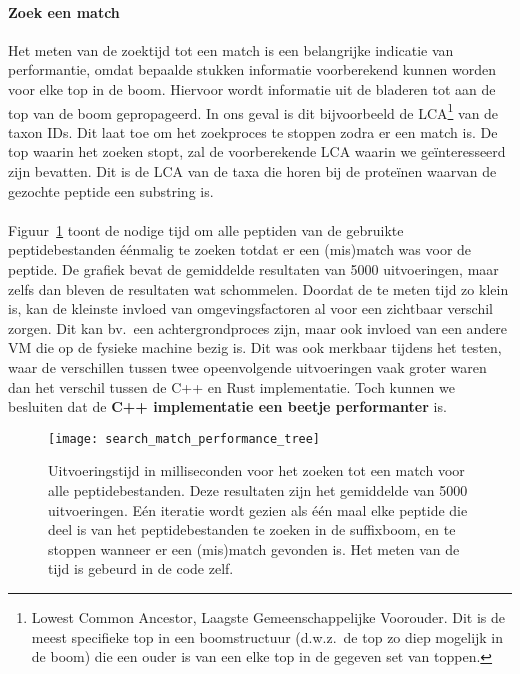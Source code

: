 \paragraph{Zoek een match}
Het meten van de zoektijd tot een match is een belangrijke indicatie van performantie, omdat bepaalde stukken informatie voorberekend kunnen worden voor elke top in de boom.
Hiervoor wordt informatie uit de bladeren tot aan de top van de boom gepropageerd.
In ons geval is dit bijvoorbeeld de LCA\footnote{Lowest Common Ancestor, Laagste Gemeenschappelijke Voorouder. Dit is de meest specifieke top in een boomstructuur (d.w.z.~de top zo diep mogelijk in de boom) die een ouder is van een elke top in de gegeven set van toppen.\label{footnote:lca}} van de taxon IDs.
Dit laat toe om het zoekproces te stoppen zodra er een match is.
De top waarin het zoeken stopt, zal de voorberekende LCA waarin we geïnteresseerd zijn bevatten.
Dit is de LCA van de taxa die horen bij de proteïnen waarvan de gezochte peptide een substring is.
\\ \\
Figuur~\ref{fig:performance_match_tree} toont de nodige tijd om alle peptiden van de gebruikte peptidebestanden éénmalig te zoeken totdat er een (mis)match was voor de peptide.
De grafiek bevat de gemiddelde resultaten van 5000 uitvoeringen, maar zelfs dan bleven de resultaten wat schommelen.
Doordat de te meten tijd zo klein is, kan de kleinste invloed van omgevingsfactoren al voor een zichtbaar verschil zorgen.
Dit kan bv.~een achtergrondproces zijn, maar ook invloed van een andere VM die op de fysieke machine bezig is.
Dit was ook merkbaar tijdens het testen, waar de verschillen tussen twee opeenvolgende uitvoeringen vaak groter waren dan het verschil tussen de C++ en Rust implementatie.
Toch kunnen we besluiten dat de \textbf{C++ implementatie een beetje performanter} is.
\\
\begin{figure}[ht]
    \centering
    \texttt{[image: search\_match\_performance\_tree]}
    \caption{Uitvoeringstijd in milliseconden voor het zoeken tot een match voor alle peptidebestanden. Deze resultaten zijn het gemiddelde van 5000 uitvoeringen. Eén iteratie wordt gezien als één maal elke peptide die deel is van het peptidebestanden te zoeken in de suffixboom, en te stoppen wanneer er een (mis)match gevonden is. Het meten van de tijd is gebeurd in de code zelf.}
    \label{fig:performance_match_tree}
\end{figure}

